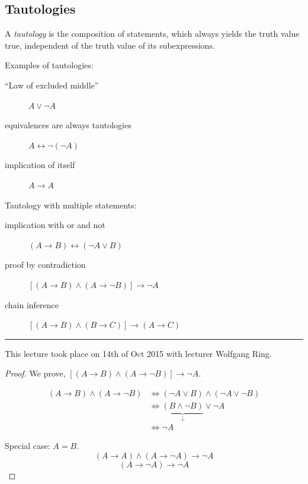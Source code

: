 \documentclass[a4paper,landscape,twocolumn]{article}
\theoremstyle{definition}
\newcommand\meta[3]{\hrule{} This #1 took place on #2 with lecturer #3.\par}
\begin{document}
\subsection{Tautologies}
%
A \emph{tautology} is the composition of statements, which always yields the truth value
true, independent of the truth value of its subexpressions.

Examples of tautologies:
\begin{description}
  \item[\enquote{Law of excluded middle}] $A \lor \neg A$
  \item[equivalences are always tautologies] $A \leftrightarrow \neg (\neg A)$
  \item[implication of itself] $A \rightarrow A$
\end{description}

Tautology with multiple statements:
\begin{description}
  \item[implication with or and not] $(A \rightarrow B) \leftrightarrow (\neg A \lor B)$
  \item[proof by contradiction] $\left[(A \rightarrow B) \land (A \rightarrow \neg B)\right] \rightarrow \neg A$
  \item[chain inference] $\left[(A \rightarrow B) \land (B \rightarrow C)\right] \rightarrow (A \rightarrow C)$
\end{description}


\meta{lecture}{14th of Oct 2015}{Wolfgang Ring}

\begin{proof}
  We prove, $\left[(A \rightarrow B) \land (A \rightarrow \neg B)\right] \rightarrow \neg A$.

  \begin{align*}
    (A \rightarrow B) \land (A \rightarrow \neg B) &\iff (\neg A \lor B) \land (\neg A \lor \neg B) \\
      &\iff \underbrace{(B \land \neg B)}_{\bot} \lor \neg A \\
      &\iff \neg A
  \end{align*}

  Special case: $A = B$.
  \[ (A \rightarrow A) \land (A \rightarrow \neg A) \rightarrow \neg A \]
  \[ (A \rightarrow \neg A) \rightarrow \neg A \]
\end{proof}
\end{document}

